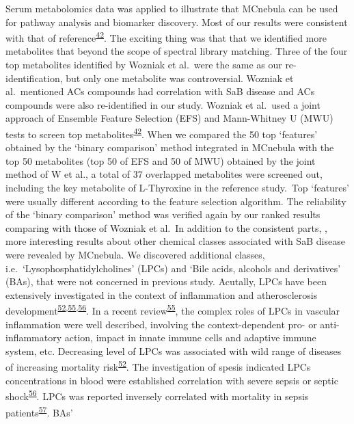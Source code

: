 \documentclass[
]{article}
\begin{document}
Serum metabolomics data was applied to illustrate that MCnebula can be
used for pathway analysis and biomarker discovery. Most of our results
were consistent with that of
reference\textsuperscript{\protect\hyperlink{ref-2020s}{42}}. The
exciting thing was that that we identified more metabolites that beyond
the scope of spectral library matching. Three of the four top
metabolites identified by Wozniak et al.~were the same as our
re-identification, but only one metabolite was controversial. Wozniak et
al.~mentioned ACs compounds had correlation with SaB disease and ACs
compounds were also re-identified in our study. Wozniak et al.~used a
joint approach of Ensemble Feature Selection (EFS) and Mann-Whitney U
(MWU) tests to screen top
metabolites\textsuperscript{\protect\hyperlink{ref-2020s}{42}}. When we
compared the 50 top `features' obtained by the `binary comparison'
method integrated in MCnebula with the top 50 metabolites (top 50 of EFS
and 50 of MWU) obtained by the joint method of W et al., a total of 37
overlapped metabolites were screened out, including the key metabolite
of L-Thyroxine in the reference study.~Top `features' were usually
different according to the feature selection algorithm. The reliability
of the `binary comparison' method was verified again by our ranked
results comparing with those of Wozniak et al.~In addition to the
consistent parts, , more interesting results about other chemical
classes associated with SaB disease were revealed by MCnebula. We
discovered additional classes, i.e.~`Lysophosphatidylcholines' (LPCs)
and `Bile acids, alcohols and derivatives' (BAs), that were not
concerned in previous study. Acutally, LPCs have been extensively
investigated in the context of inflammation and atherosclerosis
development\textsuperscript{\protect\hyperlink{ref-2016at}{52},\protect\hyperlink{ref-2020cv}{55},\protect\hyperlink{ref-2014ao}{56}}.
In a recent review\textsuperscript{\protect\hyperlink{ref-2020cv}{55}},
the complex roles of LPCs in vascular inflammation were well described,
involving the context-dependent pro- or anti-inflammatory action, impact
in innate immune cells and adaptive immune system, etc. Decreasing level
of LPCs was associated with wild range of diseases of increasing
mortality risk\textsuperscript{\protect\hyperlink{ref-2016at}{52}}. The
investigation of spesis indicated LPCs concentrations in blood were
established correlation with severe sepsis or septic
shock\textsuperscript{\protect\hyperlink{ref-2014ao}{56}}. LPCs was
reported inversely correlated with mortality in sepsis
patients\textsuperscript{\protect\hyperlink{ref-2003n}{57}}. BAs'
\end{document}
